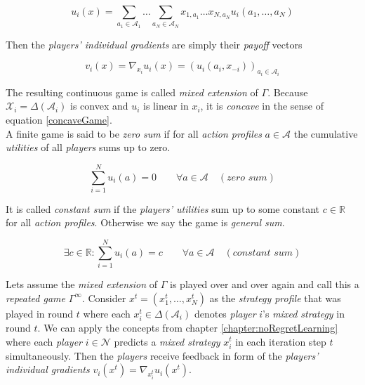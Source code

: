 \begin{equation*}
    u_i(x) = \sum_{a_1\in\mathcal{A}_1}\dots\sum_{a_N\in\mathcal{A}_N} x_{1,a_1} \dots x_{N,a_N}u_i(a_1,\dots,a_N)
\end{equation*}

Then the \textit{players' individual gradients} are simply their \textit{payoff} vectors 

\begin{equation*}
    v_i(x) = \nabla_{x_i}u_i(x) = (u_i(a_i,x_{-i}))_{a_i\in\mathcal{A}_i}
\end{equation*}

The resulting continuous game is called \textit{mixed extension} of $\Gamma$. Because $\mathcal{X}_i = \Delta(\mathcal{A}_i)$ is convex and $u_i$ is linear in $x_i$, it is \textit{concave} in the sense of equation \ref{concaveGame}. \\

A finite game is said to be \textit{zero sum} if for all \textit{action profiles} $a \in \mathcal{A}$ the cumulative \textit{utilities} of all \textit{players} sums up to zero.  

\begin{equation*}
    \sum_{i = 1}^{N} u_i(a)= 0 \qquad \forall a \in \mathcal{A} \quad (\textit{zero sum})
\end{equation*}

It is called \textit{constant sum} if the \textit{players' utilities} sum up to some constant $c \in \mathbb{R}$ for all \textit{action profiles}. Otherwise we say the game is \textit{general sum}.

\begin{equation*}
    \exists c \in \mathbb{R} : \sum_{i = 1}^{N} u_i(a)= c \qquad \forall a \in \mathcal{A} \quad (\textit{constant sum})
\end{equation*}


Lets assume the \textit{mixed extension} of $\Gamma$ is played over and over again and call this a \textit{repeated game} $\Gamma^{\infty}$. Consider $x^t = (x_{1}^{t},\dots,x_{N}^{t})$ as the \textit{strategy profile} that was played in round $t$ where each $x_{i}^{t} \in \Delta(\mathcal{A}_i)$ denotes \textit{player} $i$'s \textit{mixed strategy} in round $t$. We can apply the concepts from chapter \ref{chapter:noRegretLearning} where each \textit{player} $i \in \mathcal{N}$ predicts a \textit{mixed strategy} $x_{i}^{t}$ in each iteration step $t$ simultaneously. Then the \textit{players} receive feedback in form of the  \textit{players' individual gradients} $v_{i}(x^t) = \nabla_{x_{i}^{t}}u_{i}(x^t)$. \\

